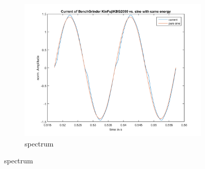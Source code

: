 \documentclass[portrait,a0b,posterdraft]{a0poster}
\begin{document}
{\begin{figure}
\begin{subfigure}{.1\textwidth}
\includegraphics[width=\linewidth]{BenchGrinder_KinFujiKBG2080_waveform.png}
\caption{spectrum}
\end{subfigure}
\end{figure}
}


\end{document}

